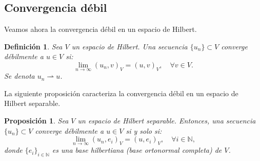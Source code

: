 \documentclass[12pt]{book}
\newtheorem{proposition}{Proposición}
\newtheorem{definition}{Definición}
\theoremstyle{definition}
\theoremstyle{plain}
\theoremstyle{remark}
\begin{document}
\subsection{Convergencia débil}

Veamos ahora la convergencia débil en un espacio de Hilbert.

\begin{definition}
Sea \(V\) un espacio de Hilbert. Una secuencia \(\{u_n\} \subset V\) converge débilmente a \(u \in V\) si:
\[
\lim_{n \to \infty} ( u_n, v )_V = ( u, v )_V, \quad \forall v \in V.
\]
Se denota \(u_n \rightharpoonup u\).
\end{definition}

La siguiente proposición caracteriza la convergencia débil en un espacio de Hilbert separable.

\begin{proposition}
    Sea \(V\) un espacio de Hilbert separable. Entonces, una secuencia \(\{u_n\} \subset V\) converge débilmente a \(u \in V\) si y solo si:
    \[
    \lim_{n \to \infty} ( u_n, e_i )_V = ( u, e_i )_V, \quad \forall i \in \mathbb{N},
    \]
    donde \(\{e_i\}_{i \in \mathbb{N}}\) es una base hilbertiana (base ortonormal completa) de \(V\).
\end{proposition}
\end{document}

